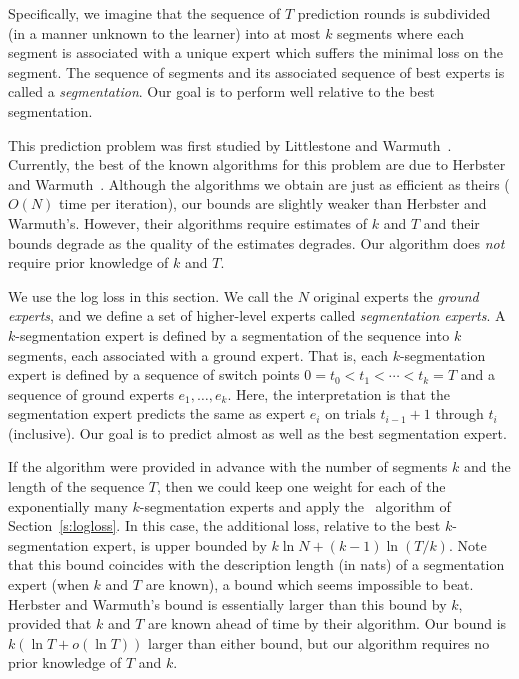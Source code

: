 Specifically, we imagine that the sequence of $T$ prediction rounds
is subdivided (in a manner
unknown to the learner) into at most $k$
segments where each segment is associated with a unique expert which
suffers the minimal loss on the segment.
The sequence of segments and its
associated sequence of best experts is called a {\em segmentation}.
Our goal is to perform well relative to the best segmentation.

This prediction problem was first studied by Littlestone
and Warmuth~\cite{LittlestoneWa94}.
Currently, the best of the known algorithms for this problem are
due to Herbster and Warmuth~\cite{HerbsterWa95}.
Although the algorithms we obtain
are just as efficient as theirs ($O(N)$ time per iteration),
our bounds are slightly weaker than Herbster and
Warmuth's. However, their algorithms require estimates of $k$ and $T$
and their bounds degrade as the quality of the estimates degrades.
Our algorithm does {\em not\/} require prior knowledge of $k$ and $T$.


We use the log loss
in this section.
We call the $N$ original experts the {\em ground experts}, and
we define a set of higher-level experts called 
{\em segmentation experts}.
A $k$-segmentation expert is defined by a segmentation of the sequence
into $k$ segments, each associated with a ground expert.
That is, each $k$-segmentation expert is defined by a sequence of
switch points
$0 = t_0 < t_1 < \cdots < t_{k} = T$ and a sequence of ground experts
$e_1,\ldots,e_k$.
Here, the interpretation is that the segmentation expert predicts the same as
expert $e_i$ on trials $t_{i-1} + 1$ through $t_i$ (inclusive).
Our goal is to predict almost as well as the best segmentation expert.

If the algorithm were provided in advance
with the number of segments $k$ and the length of the sequence $T$, then
we could keep one weight for each of the exponentially many $k$-segmentation
experts and apply the \Bayes\ algorithm of Section~\ref{s:logloss}.
In this case, the additional loss, relative to the best $k$-segmentation
expert, is upper bounded by
$k \ln N + (k-1) \ln ({T}/{k})$.
Note that this bound coincides with the description length (in nats)
of a segmentation expert (when $k$ and $T$ are known), a bound which
seems impossible to beat.
Herbster and Warmuth's bound is essentially larger
than this bound by $k$, provided that $k$ and $T$ are known ahead of
time by their algorithm.
Our bound is
$k (\ln T + o(\ln T))$ larger than either bound,
but our algorithm requires no prior knowledge of $T$ and $k$.

